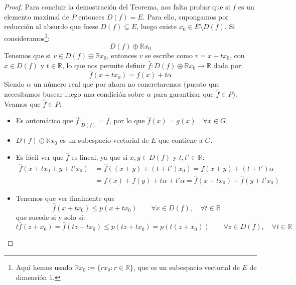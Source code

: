\begin{teo}
\begin{proof}
        \noindent
        Para concluir la demostración del Teorema, nos falta probar que si $f$ es un elemento maximal de $P$ entonces $D(f) = E$. Para ello, supongamos por reducción al absurdo que fuese $D(f)\subsetneq E$, luego existe $x_0\in E\setminus D(f)$. Si consideramos\footnote{Aquí hemos usado $\mathbb{R} x_0:= \{rx_0  : r\in \mathbb{R}\}$, que es un subespacio vectorial de $E$ de dimensión 1.}:
        \begin{equation*}
            D(f) \oplus \mathbb{R}x_0
        \end{equation*}
        Tenemos que si $v\in D(f)\oplus \mathbb{R}x_0$, entonces $v$ se escribe como $v = x+tx_0$, con $x\in D(f)$ y $t\in \mathbb{R}$, lo que nos permite definir $\hat{f}:D(f)\oplus \mathbb{R}x_0\to \mathbb{R}$ dada por:
        \begin{equation*}
            \hat{f}(x+tx_0) = f(x) + t\alpha
        \end{equation*}
        Siendo $\alpha$ un número real que por ahora no concretaremos (puesto que necesitamos buscar luego una condición sobre $\alpha$ para garantizar que $\hat{f}\in P$). Veamos que $\hat{f} \in P$:
        \begin{itemize}
            \item Es automático que $\hat{f}\big|_{D(f)} = f$, por lo que $\hat{f}(x) = g(x)\quad \forall x\in G$.
            \item $D(f)\oplus \mathbb{R}x_0$ es un subespacio vectorial de $E$ que contiene a $G$.
            \item Es fácil ver que $\hat{f}$ es lineal, ya que si $x,y\in D(f)$ y $t,t'\in \mathbb{R}$:
                \begin{align*}
                    \hat{f}(x+tx_0 + y+t'x_0) &= \hat{f}((x+y) + (t+t')x_0) = f(x+y) + (t+t')\alpha \\
                                              &= f(x) + f(y) + t\alpha + t'\alpha = \hat{f}(x+tx_0) + \hat{f}(y+t'x_0)
                \end{align*}
            \item Tenemos que ver finalmente que 
                \begin{equation}\label{eq:fgorromenorp}
                    \hat{f}(x+tx_0) \leq p(x+tx_0)\qquad \forall x\in D(f),\quad  \forall t\in \mathbb{R}
                \end{equation}
                que sucede si y solo si:
                \begin{equation*}
                    t\hat{f}(z+x_0) = \hat{f}(tz+tx_0) \leq p(tz+tx_0) = p(t(z+x_0)) \qquad \forall z\in D(f), \quad \forall t\in \mathbb{R}

\end{equation*}
\end{itemize}
\end{proof}
\end{teo}

